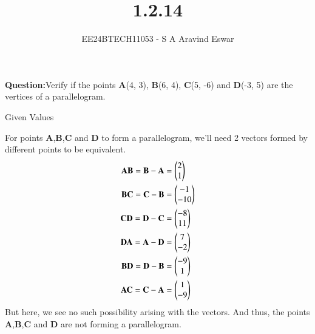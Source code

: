 \documentclass[journal]{IEEEtran}
\begin{document}

\vspace{3cm}

\title{1.2.14}
\author{EE24BTECH11053 - S A Aravind Eswar
}
{\let\newpage\relax\maketitle}

\renewcommand{\thefigure}{\theenumi}
\renewcommand{\thetable}{\theenumi}
\setlength{\intextsep}{10pt} %


\renewcommand{\thetable}{\theenumi}

\textbf{Question:}Verify if the points \textbf{A}(4, 3), \textbf{B}(6, 4), \textbf{C}(5, -6) and \textbf{D}(-3, 5) are the vertices of a
parallelogram.\\
\solution 
\begin{table}[h]
	\centering
	
	\caption{Given Values}
	\label{tab:1}
\end{table}

For points \textbf{A},\textbf{B},\textbf{C} and \textbf{D} to form a parallelogram, we'll need 2 vectors formed by different points to be equivalent.
\begin{align}\textbf{AB} = \textbf{B}-\textbf{A} &= \begin{pmatrix}2\\1\end{pmatrix}\\\textbf{BC} = \textbf{C}-\textbf{B} &= \begin{pmatrix}-1\\-10\end{pmatrix}\\\textbf{CD} =\textbf{D}-\textbf{C} &=\begin{pmatrix}-8\\11\end{pmatrix}\\\textbf{DA} = \textbf{A}-\textbf{D} &= \begin{pmatrix}7\\-2\end{pmatrix}\\\textbf{BD} = \textbf{D}-\textbf{B} &= \begin{pmatrix}-9\\1\end{pmatrix}\\\textbf{AC} = \textbf{C}-\textbf{A} &= \begin{pmatrix}1\\-9\end{pmatrix}\end{align}
But here, we see no such possibility arising with the vectors. And thus, the points \textbf{A},\textbf{B},\textbf{C} and \textbf{D} are not forming a parallelogram.
\end{document}
